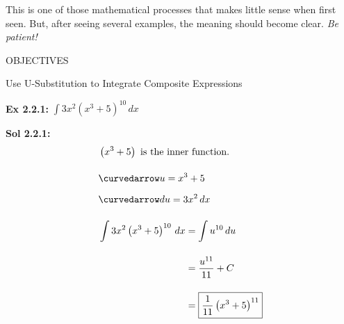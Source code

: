 This is one of those mathematical processes that makes little sense when first seen. But, after seeing several examples, the meaning should become clear. \textit{Be patient!} \par

\begin{tcolorbox}[objective]
    \begin{center}
        OBJECTIVES \\[11pt]
    \end{center}
    Use U-Substitution to Integrate Composite Expressions 
\end{tcolorbox} \vspace{11pt}

\begin{tcolorbox}[example]
    \textbf{Ex 2.2.1: } $\int 3x^2\left(x^3 + 5\right)^{10} \, dx$
\end{tcolorbox}
\begin{tcolorbox}[solution]
    \textbf{Sol 2.2.1: } \begin{align*}
        & \left(x^3 + 5\right) \text{ is the inner function.} \\[11pt]
        & \curvedarrow u = x^3 + 5 \\[5.5pt]
        & \curvedarrow du = 3x^2 \, dx \\[11pt]
        & \int 3x^2\left(x^3 + 5\right)^{10} \, dx \begin{aligned}[t]
            & = \int u^{10} \, du \\[11pt]
            & = \dfrac{u^{11}}{11} + C \\[11pt]
            & = \boxed{\dfrac{1}{11}\left(x^3 + 5\right)^{11}}
        \end{aligned}
    \end{align*}
\end{tcolorbox} \vspace{11pt}

